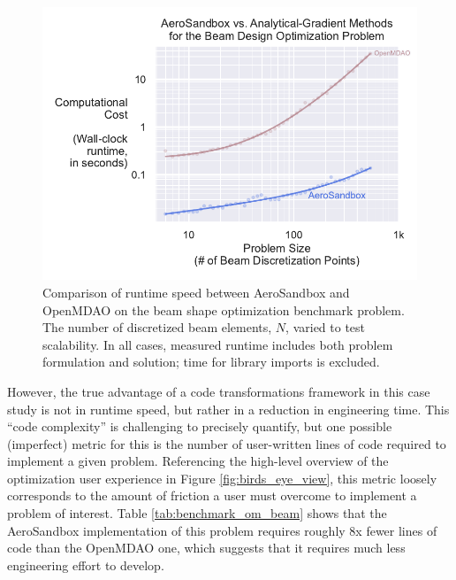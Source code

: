 \begin{figure}[h]
    \centering
    \includegraphics[width=\textwidth]{../figures/benchmark_om_beam.pdf}
    \caption{Comparison of runtime speed between AeroSandbox and OpenMDAO on the beam shape optimization benchmark problem. The number of discretized beam elements, $N$, varied to test scalability. In all cases, measured runtime includes both problem formulation and solution; time for library imports is excluded.}
    \label{fig:benchmark_om_beam}
\end{figure}

However, the true advantage of a code transformations framework in this case study is not in runtime speed, but rather in a reduction in engineering time. This ``code complexity'' is challenging to precisely quantify, but one possible (imperfect) metric for this is the number of user-written lines of code required to implement a given problem. Referencing the high-level overview of the optimization user experience in Figure \ref{fig:birds_eye_view}, this metric loosely corresponds to the amount of friction a user must overcome to implement a problem of interest. Table \ref{tab:benchmark_om_beam} shows that the AeroSandbox implementation of this problem requires roughly 8x fewer lines of code than the OpenMDAO one, which suggests that it requires much less engineering effort to develop.

